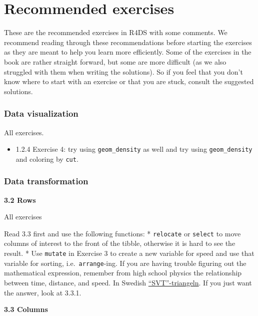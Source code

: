 \documentclass[
  letterpaper,
  DIV=11,
  numbers=noendperiod]{scrreprt}
\providecommand{\tightlist}{%
  \setlength{\itemsep}{0pt}\setlength{\parskip}{0pt}}\usepackage{longtable,booktabs,array}
\begin{document}
\chapter{Recommended exercises}\label{recommended-exercises}

These are the recommended exercises in R4DS with some comments. We
recommend reading through these recommendations before starting the
exercises as they are meant to help you learn more efficiently. Some of
the exercises in the book are rather straight forward, but some are more
difficult (as we also struggled with them when writing the solutions).
So if you feel that you don't know where to start with an exercise or
that you are stuck, consult the suggested solutions.

\subsection*{Data visualization}\label{data-visualization}

All exercises.

\begin{itemize}
\tightlist
\item
  1.2.4 Exercise 4: try using \texttt{geom\_density} as well and try
  using \texttt{geom\_density} and coloring by \texttt{cut}.
\end{itemize}

\subsection*{Data transformation}\label{data-transformation}

\textbf{3.2 Rows}

All exercises

Read 3.3 first and use the following functions: * \texttt{relocate} or
\texttt{select} to move columns of interest to the front of the tibble,
otherwise it is hard to see the result. * Use \texttt{mutate} in
Exercise 3 to create a new variable for speed and use that variable for
sorting, i.e.~\texttt{arrange}-ing. If you are having trouble figuring
out the mathematical expression, remember from high school physics the
relationship between time, distance, and speed. In Swedish
\href{https://sv.wikipedia.org/wiki/SVT-triangel}{``SVT''-triangeln}. If
you just want the answer, look at 3.3.1.

\textbf{3.3 Columns}
\end{document}
